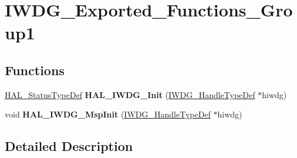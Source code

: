 \hypertarget{group___i_w_d_g___exported___functions___group1}{}\section{I\+W\+D\+G\+\_\+\+Exported\+\_\+\+Functions\+\_\+\+Group1}
\label{group___i_w_d_g___exported___functions___group1}
\subsection*{Functions}
\begin{DoxyCompactItemize}
\item 
\hyperlink{stm32f4xx__hal__def_8h_a63c0679d1cb8b8c684fbb0632743478f}{H\+A\+L\+\_\+\+Status\+Type\+Def} {\bfseries H\+A\+L\+\_\+\+I\+W\+D\+G\+\_\+\+Init} (\hyperlink{struct_i_w_d_g___handle_type_def}{I\+W\+D\+G\+\_\+\+Handle\+Type\+Def} $\ast$hiwdg)\hypertarget{group___i_w_d_g___exported___functions___group1_ga2e1669e60f2dc298fecaed919e7ae810}{}\label{group___i_w_d_g___exported___functions___group1_ga2e1669e60f2dc298fecaed919e7ae810}

\item 
void {\bfseries H\+A\+L\+\_\+\+I\+W\+D\+G\+\_\+\+Msp\+Init} (\hyperlink{struct_i_w_d_g___handle_type_def}{I\+W\+D\+G\+\_\+\+Handle\+Type\+Def} $\ast$hiwdg)\hypertarget{group___i_w_d_g___exported___functions___group1_gaf26b08d1a805d1dd515cafd0278c240c}{}\label{group___i_w_d_g___exported___functions___group1_gaf26b08d1a805d1dd515cafd0278c240c}

\end{DoxyCompactItemize}


\subsection{Detailed Description}

